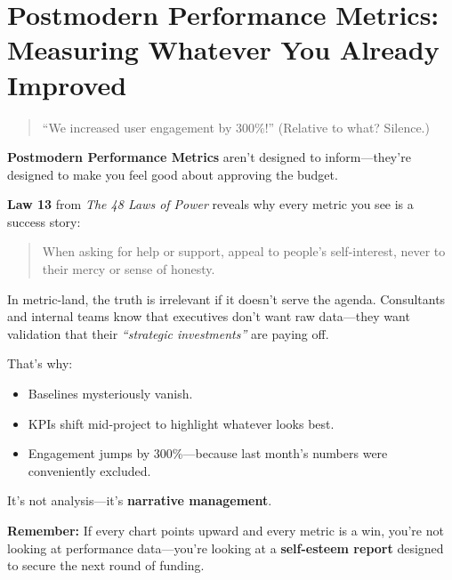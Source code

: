 \section{Postmodern Performance Metrics: Measuring Whatever You Already Improved}

\begin{quote}
“We increased user engagement by 300\%!” (Relative to what? Silence.)
\end{quote}

  \textbf{Postmodern Performance Metrics} aren’t designed to inform—they’re designed to make you feel good about approving the budget.
  
  \medskip
  
  \textbf{Law 13} from \textit{The 48 Laws of Power} reveals why every metric you see is a success story:
  \begin{quote}
  When asking for help or support, appeal to people’s self-interest, never to their mercy or sense of honesty.
  \end{quote}
  
  \medskip
  
  In metric-land, the truth is irrelevant if it doesn’t serve the agenda.  Consultants and internal teams know that executives don’t want raw data—they want validation that their \textit{``strategic investments''} are paying off.
  
  \medskip
  
  That’s why:
  \begin{itemize}
    \item Baselines mysteriously vanish.
    \item KPIs shift mid-project to highlight whatever looks best.
    \item Engagement jumps by 300\%—because last month’s numbers were conveniently excluded.
  \end{itemize}
  
  \medskip
  
  It’s not analysis—it’s \textbf{narrative management}.
  
  \medskip
  
  \textbf{Remember:} If every chart points upward and every metric is a win, you're not looking at performance data—you're looking at a \textbf{self-esteem report} designed to secure the next round of funding.
  





